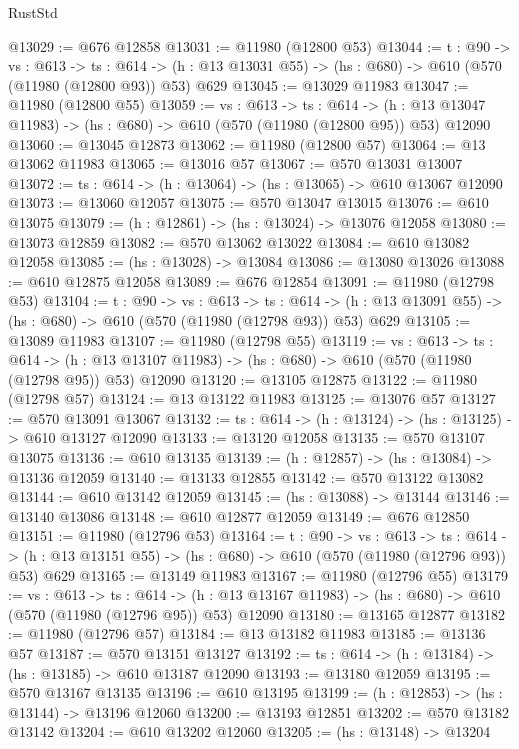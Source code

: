 \begin{lexlean}{RustStd}
\begin{coremodule}
@13029 := @676 @12858
@13031 := @11980 (@12800 @53)
@13044 := {t : @90} ->
  {vs : @613} ->
  {ts : @614} -> (h : @13 @13031 @55) -> (hs : @680) -> @610 (@570 (@11980 (@12800 @93)) @53) @629
@13045 := @13029 @11983
@13047 := @11980 (@12800 @55)
@13059 := {vs : @613} ->
  {ts : @614} ->
  (h : @13 @13047 @11983) -> (hs : @680) -> @610 (@570 (@11980 (@12800 @95)) @53) @12090
@13060 := @13045 @12873
@13062 := @11980 (@12800 @57)
@13064 := @13 @13062 @11983
@13065 := @13016 @57
@13067 := @570 @13031 @13007
@13072 := {ts : @614} -> (h : @13064) -> (hs : @13065) -> @610 @13067 @12090
@13073 := @13060 @12057
@13075 := @570 @13047 @13015
@13076 := @610 @13075
@13079 := (h : @12861) -> (hs : @13024) -> @13076 @12058
@13080 := @13073 @12859
@13082 := @570 @13062 @13022
@13084 := @610 @13082 @12058
@13085 := (hs : @13028) -> @13084
@13086 := @13080 @13026
@13088 := @610 @12875 @12058
@13089 := @676 @12854
@13091 := @11980 (@12798 @53)
@13104 := {t : @90} ->
  {vs : @613} ->
  {ts : @614} -> (h : @13 @13091 @55) -> (hs : @680) -> @610 (@570 (@11980 (@12798 @93)) @53) @629
@13105 := @13089 @11983
@13107 := @11980 (@12798 @55)
@13119 := {vs : @613} ->
  {ts : @614} ->
  (h : @13 @13107 @11983) -> (hs : @680) -> @610 (@570 (@11980 (@12798 @95)) @53) @12090
@13120 := @13105 @12875
@13122 := @11980 (@12798 @57)
@13124 := @13 @13122 @11983
@13125 := @13076 @57
@13127 := @570 @13091 @13067
@13132 := {ts : @614} -> (h : @13124) -> (hs : @13125) -> @610 @13127 @12090
@13133 := @13120 @12058
@13135 := @570 @13107 @13075
@13136 := @610 @13135
@13139 := (h : @12857) -> (hs : @13084) -> @13136 @12059
@13140 := @13133 @12855
@13142 := @570 @13122 @13082
@13144 := @610 @13142 @12059
@13145 := (hs : @13088) -> @13144
@13146 := @13140 @13086
@13148 := @610 @12877 @12059
@13149 := @676 @12850
@13151 := @11980 (@12796 @53)
@13164 := {t : @90} ->
  {vs : @613} ->
  {ts : @614} -> (h : @13 @13151 @55) -> (hs : @680) -> @610 (@570 (@11980 (@12796 @93)) @53) @629
@13165 := @13149 @11983
@13167 := @11980 (@12796 @55)
@13179 := {vs : @613} ->
  {ts : @614} ->
  (h : @13 @13167 @11983) -> (hs : @680) -> @610 (@570 (@11980 (@12796 @95)) @53) @12090
@13180 := @13165 @12877
@13182 := @11980 (@12796 @57)
@13184 := @13 @13182 @11983
@13185 := @13136 @57
@13187 := @570 @13151 @13127
@13192 := {ts : @614} -> (h : @13184) -> (hs : @13185) -> @610 @13187 @12090
@13193 := @13180 @12059
@13195 := @570 @13167 @13135
@13196 := @610 @13195
@13199 := (h : @12853) -> (hs : @13144) -> @13196 @12060
@13200 := @13193 @12851
@13202 := @570 @13182 @13142
@13204 := @610 @13202 @12060
@13205 := (hs : @13148) -> @13204

\end{coremodule}
\end{lexlean}

